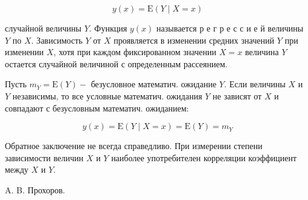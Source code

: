 \documentclass[10pt]{article}
\begin{document}
\[

y(x)=\mathrm{E}(Y \mid X=x)

\]



случайной величины $Y$. Функция $y(x)$ называется р е г р е с с и е й величины $Y$ по $X$. Зависимость $Y$ от $X$ проявляется в изменении средних значений $Y$ при изменении $X$, хотя при каждом фиксированном значении $X=x$ величина $Y$ остается случайной величиной с определенным рассеянием.



Пусть $m_{Y}=\mathrm{E}(Y)-$ безусловное математич. ожидание $Y$. Если величины $X$ и $Y$ независимы, то все условные математич. ожидания $Y$ не зависят от $X$ и совпадают с безусловным математич. ожиданием:



\[

y(x)=\mathrm{E}(Y \mid X=x)=\mathrm{E}(Y)=m_{Y}

\]



Обратное заключение не всегда справедливо. При измерении степени зависимости величин $X$ и $Y$ наиболее употребителен корреляции коэффициент между $X$ и $Y$.



A. B. Прохоров.
\end{document}
